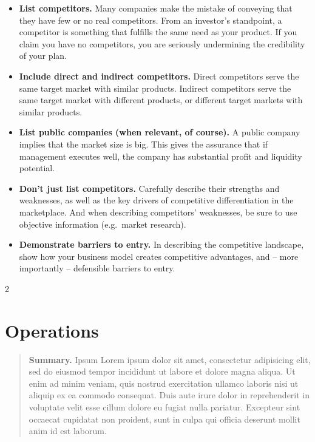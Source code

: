 \documentclass[9pt,]{book}
\providecommand{\tightlist}{%
  \setlength{\itemsep}{0pt}\setlength{\parskip}{0pt}}
\begin{document}
\begin{itemize}
\tightlist
\item
  \textbf{List competitors.} Many companies make the mistake of
  conveying that they have few or no real competitors. From an
  investor's standpoint, a competitor is something that fulfills the
  same need as your product. If you claim you have no competitors, you
  are seriously undermining the credibility of your plan.
\item
  \textbf{Include direct and indirect competitors.} Direct competitors
  serve the same target market with similar products. Indirect
  competitors serve the same target market with different products, or
  different target markets with similar products.
\item
  \textbf{List public companies (when relevant, of course).} A public
  company implies that the market size is big. This gives the assurance
  that if management executes well, the company has substantial profit
  and liquidity potential.
\item
  \textbf{Don't just list competitors.} Carefully describe their
  strengths and weaknesses, as well as the key drivers of competitive
  differentiation in the marketplace. And when describing competitors'
  weaknesses, be sure to use objective information (e.g.~market
  research).
\item
  \textbf{Demonstrate barriers to entry.} In describing the competitive
  landscape, show how your business model creates competitive
  advantages, and -- more importantly -- defensible barriers to entry.
\end{itemize}

\begin {multicols}{2}

\lipsum

\end {multicols}

\hypertarget{operations}{%
\chapter{Operations}\label{operations}}

\begin{quote}
\textbf{Summary.} Ipsum Lorem ipsum dolor sit amet, consectetur
adipisicing elit, sed do eiusmod tempor incididunt ut labore et dolore
magna aliqua. Ut enim ad minim veniam, quis nostrud exercitation ullamco
laboris nisi ut aliquip ex ea commodo consequat. Duis aute irure dolor
in reprehenderit in voluptate velit esse cillum dolore eu fugiat nulla
pariatur. Excepteur sint occaecat cupidatat non proident, sunt in culpa
qui officia deserunt mollit anim id est laborum.
\end{quote}
\end{document}
